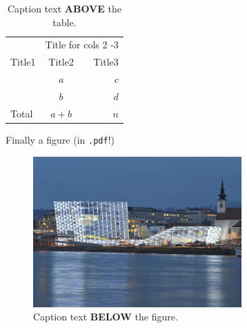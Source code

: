 \documentclass[twoside]{report}
\begin{document}
\begin{table}[!ht]\centering
\caption{\label{smith:tab2} Caption text \textbf{ABOVE} the table.}
\medskip
\begin{tabular}{lcr}
\toprule[0.09 em]
  &\multicolumn{2}{c}{Title  for cols 2 -3} \\
\cmidrule{2-3} %
Title1 & Title2 & Title3 \\
\midrule
& $a$  & $c$ \\
& $b$  & $d$ \\ %
\midrule[0 em]
Total  & $a+b$  & $n$  \\
\bottomrule[0.09 em]
\end{tabular}
\end{table}




%
%

Finally a figure (in \verb|.pdf|!)

\begin{figure}[bt!]\centering
\includegraphics[width=8cm]{exFig.pdf}
\caption{\label{smith:fig1} Caption text \textbf{BELOW} the figure.}
\end{figure}
\end{document}
